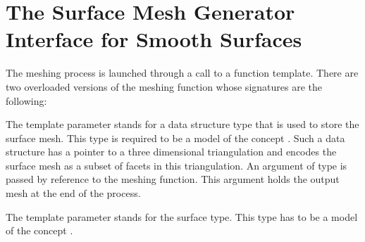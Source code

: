 \section{The Surface Mesh Generator Interface for Smooth Surfaces\label{SurfaceMesher_section_interface}}
\def\ccLongParamLayout{\ccTrue}
The meshing process is launched through a call to a function template.
There are two overloaded versions of the meshing function
whose signatures are the following:






The template parameter  
stands for  a  data structure type  that is used
to store  the surface mesh.  This type is required to be
a model of the concept .
Such a data structure 
has a pointer to a three dimensional triangulation and encodes
the surface mesh as a subset of facets in this triangulation.
An argument of type   is passed by reference to the meshing
function. This argument holds the output mesh at the end of the
process.

The template parameter   stands for the surface type.
This type has to be a model of the concept .


